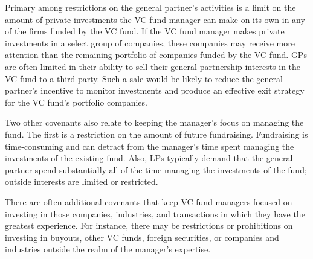\documentclass[11pt]{article}
\begin{document}
Primary among restrictions on the general partner's activities is a limit on the amount of private investments the VC fund manager can make on its own in any of the firms funded by the VC fund. If the VC fund manager makes private investments in a select group of companies, these companies may receive more attention than the remaining portfolio of companies funded by the VC fund. GPs are often limited in their ability to sell their general partnership interests in the VC fund to a third party. Such a sale would be likely to reduce the general partner's incentive to monitor investments and produce an effective exit strategy for the VC fund's portfolio companies.

Two other covenants also relate to keeping the manager's focus on managing the fund. The first is a restriction on the amount of future fundraising. Fundraising is time-consuming and can detract from the manager's time spent managing the investments of the existing fund. Also, LPs typically demand that the general partner spend substantially all of the time managing the investments of the fund; outside interests are limited or restricted.

There are often additional covenants that keep VC fund managers focused on investing in those companies, industries, and transactions in which they have the greatest experience. For instance, there may be restrictions or prohibitions on investing in buyouts, other VC funds, foreign securities, or companies and industries outside the realm of the manager's expertise.
\end{document}
